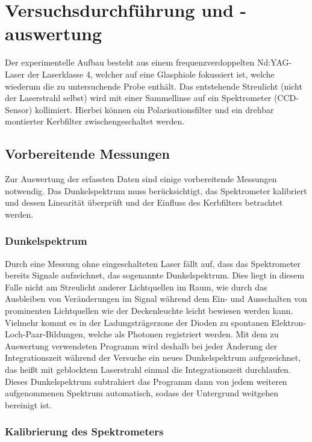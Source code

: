 \documentclass[../bericht.tex]{subfiles}
\begin{document}
  \chapter{Versuchsdurchführung und -auswertung}

    Der experimentelle Aufbau besteht aus einem frequenzverdoppelten Nd:YAG-Laser der Laserklasse 4, welcher auf eine Glasphiole fokussiert ist, welche wiederum die zu untersuchende Probe enthält. Das entstehende Streulicht (nicht der Laserstrahl selbst) wird mit einer Sammellinse auf ein Spektrometer (CCD-Sensor) kollimiert. Hierbei können ein Polarisationsfilter und ein drehbar montierter Kerbfilter zwischengeschaltet werden.


    \section{Vorbereitende Messungen}

      Zur Auswertung der erfassten Daten sind einige vorbereitende Messungen notwendig. Das Dunkelspektrum muss berücksichtigt, das Spektrometer kalibriert und dessen Linearität überprüft und der Einfluss des Kerbfilters betrachtet werden.


      \subsection{Dunkelspektrum}

        Durch eine Messung ohne eingeschalteten Laser fällt auf, dass das Spektrometer bereits Signale aufzeichnet, das sogenannte Dunkelspektrum. Dies liegt in diesem Falle nicht am Streulicht anderer Lichtquellen im Raum, wie durch das Ausbleiben von Veränderungen im Signal während dem Ein- und Ausschalten von prominenten Lichtquellen wie der Deckenleuchte leicht bewiesen werden kann. Vielmehr kommt es in der Ladungsträgerzone der Dioden zu spontanen Elektron-Loch-Paar-Bildungen, welche als Photonen registriert werden. Mit dem zu Auswertung verwendeten Programm wird deshalb bei jeder Änderung der Integrationszeit während der Versuche ein neues Dunkelspektrum aufgezeichnet, das heißt mit geblocktem Laserstrahl einmal die Integrationszeit durchlaufen. Dieses Dunkelspektrum subtrahiert das Programm dann von jedem weiteren aufgenommenen Spektrum automatisch, sodass der Untergrund weitgehen bereinigt ist.


      \subsection{Kalibrierung des Spektrometers}
      \label{subsec:kalibrierung}
\end{document}
